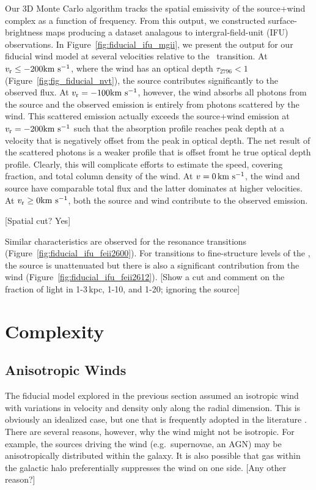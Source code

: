 \documentclass[12pt,preprint]{aastex}
\begin{document}
Our 3D Monte Carlo algorithm tracks the spatial emissivity of the source+wind
complex as a function of frequency.  From this output, we
constructed surface-brightness maps producing a
dataset analagous to intergral-field-unit (IFU) observations.  In
Figure~\ref{fig:fiducial_ifu_mgii}, we present the output for our
fiducial wind model at several velocities relative to the \mgiia\
transition. At $v_{\rm r} \le -200 {\rm km~s^{-1}}$, where the wind has an optical
depth $\tau_{2796} < 1$ (Figure~\ref{fig:fig_fiducial_nvt}),
the source contributes significantly to the observed flux.  
At $v_{\rm r}=-100 {\rm km~s^{-1}}$, however, the
wind absorbs all photons from the source and the observed emission is
entirely from photons scattered by the wind.  This scattered emission
actually exceeds the source+wind emission at 
$v_{\rm r} = -200{\rm km~s^{-1}}$ such
that the absorption profile reaches peak depth at a velocity that is
negatively offset from
the peak in optical depth.  The net result of the scattered photons is
a weaker \ion{Mg}{2} profile that is offset fromt he true optical
depth profile.  Clearly, this will complicate efforts to estimate the
speed, covering fraction, and total column density of the wind.  At $v
= 0 \, {\rm km~s^{-1}}$, the wind and source have comparable total flux and the
latter dominates at higher velocities.  
At $v_{\rm r} \ge 0
{\rm km~s^{-1}}$,  both the source and wind contribute to the observed emission.

[Spatial cut? Yes]

Similar characteristics are observed for the  resonance
transitions (Figure~\ref{fig:fiducial_ifu_feii2600}).
For transitions to fine-structure levels of the \aconfig, the source
is unattenuated but there is also a significant contribution from the
wind (Figure~\ref{fig:fiducial_ifu_feii2612}).
[Show a cut and comment on the fraction of light in 1-3\,kpc, 1-10,
and 1-20; ignoring the source]

\section{Complexity}

\subsection{Anisotropic Winds}
\label{sec:anisotropic}

The fiducial model explored in the previous section assumed an
isotropic wind with variations in velocity and density only
along the radial dimension.  This is obviously an idealized case, but
one that is frequently adopted in the literature
\citep[e.g.][]{steidel+10}.   There are several reasons, however, why
the wind might not be isotropic.  For example, the sources driving the
wind (e.g.\ supernovae, an AGN) may be anisotropically distributed
within the galaxy.  It is also possible that gas within the galactic
halo preferentially suppresses the wind on one side.  [Any other
reason?]
\end{document}
